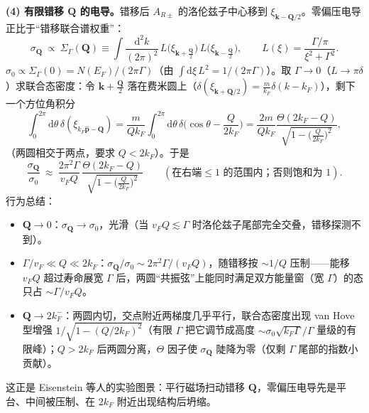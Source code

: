 \textbf{(4) 有限错移 $\pmb{Q}$ 的电导。}错移后 $A_{R\pm}$ 的洛伦兹子中心移到 $\xi_{\pmb{k}-\pmb{Q}/2}$。零偏压电导正比于“错移联合谱权重”：
\begin{equation*}
\sigma_{\pmb{Q}}\ \propto\ \Sigma_{\Gamma}(\pmb{Q})\equiv\int\frac{\mathrm{d}^2k}{(2\pi)^2}\,
L\big(\xi_{\pmb{k}+\frac{\pmb{Q}}{2}}\big)\,L\big(\xi_{\pmb{k}-\frac{\pmb{Q}}{2}}\big),
\qquad L(\xi)=\frac{\Gamma/\pi}{\xi^2+\Gamma^2}.
\end{equation*}
$\sigma_0\propto\Sigma_\Gamma(0)=N(E_F)/(2\pi\Gamma)$（由 $\int\mathrm{d}\xi\,L^2=1/(2\pi\Gamma)$）。取 $\Gamma\to0$（$L\to\pi\delta$）求联合态密度：令 $\pmb{k}+\frac{\pmb{Q}}{2}$ 落在费米圆上（$\delta(\xi_{\pmb{k}+\pmb{Q}/2})=\frac{m}{k_F}\delta(k-k_F)$），剩下一个方位角积分
\begin{equation*}
\int_0^{2\pi}\mathrm{d}\theta\,\delta(\xi_{k_F\hat{\pmb{p}}-\pmb{Q}})
=\frac{m}{Qk_F}\int_0^{2\pi}\mathrm{d}\theta\,\delta\Big(\cos\theta-\frac{Q}{2k_F}\Big)
=\frac{2m}{Qk_F}\frac{\Theta(2k_F-Q)}{\sqrt{1-\big(\frac{Q}{2k_F}\big)^2}} ,
\end{equation*}
（两圆相交于两点，要求 $Q<2k_F$）。于是
\begin{equation*}
\frac{\sigma_{\pmb{Q}}}{\sigma_0}\ \approx\ \frac{2\pi^2\Gamma}{v_F Q}\,
\frac{\Theta(2k_F-Q)}{\sqrt{1-\big(\frac{Q}{2k_F}\big)^2}}
\qquad(\text{在右端}\le1\text{ 的范围内；否则饱和为 }1).
\end{equation*}
行为总结：
\begin{itemize}
\item $\pmb{Q}\to0$：$\sigma_{\pmb{Q}}\to\sigma_0$，光滑（当 $v_FQ\lesssim\Gamma$ 时洛伦兹子尾部完全交叠，错移探测不到）。
\item $\Gamma/v_F\ll Q\ll2k_F$：$\sigma_{\pmb{Q}}/\sigma_0\sim2\pi^2\Gamma/(v_FQ)$，随错移按 $\sim1/Q$ 压制——能移 $v_FQ$ 超过寿命展宽 $\Gamma$ 后，两圆“共振弦”上能同时满足双方能量窗（宽 $\Gamma$）的态只占 $\sim\Gamma/v_FQ$。
\item $\pmb{Q}\to2k_F^-$：两圆内切，交点附近两梯度几乎平行，联合态密度出现 van Hove 型增强 $1/\sqrt{1-(Q/2k_F)^2}$（有限 $\Gamma$ 把它调节成高度 $\sim\sigma_0\sqrt{k_F\Gamma}/\Gamma$ 量级的有限峰）；$Q>2k_F$ 后两圆分离，$\Theta$ 因子使 $\sigma_{\pmb{Q}}$ 陡降为零（仅剩 $\Gamma$ 尾部的指数小贡献）。
\end{itemize}
这正是 Eisenstein 等人的实验图景：平行磁场扫动错移 $\pmb{Q}$，零偏压电导先是平台、中间被压制、在 $2k_F$ 附近出现结构后坍缩。

